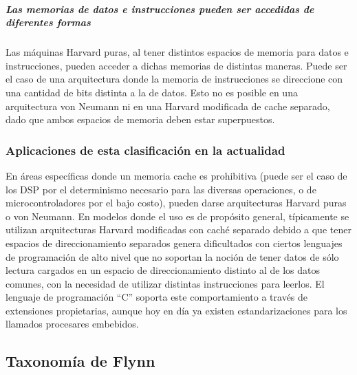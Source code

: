 \subparagraph{Las memorias de datos e instrucciones pueden ser accedidas de
diferentes formas}
\label{subpar:theory-modern-memory_access-modified_harvard-characteristitcs-3}

Las máquinas Harvard puras, al tener distintos espacios de memoria para datos e
instrucciones, pueden acceder a dichas memorias de distintas maneras. Puede ser
el caso de una arquitectura donde la memoria de instrucciones se direccione con
una cantidad de bits distinta a la de datos. Esto no es posible en una
arquitectura von Neumann ni en una Harvard modificada de cache separado, dado
que ambos espacios de memoria deben estar superpuestos.

\subsubsection{Aplicaciones de esta clasificación en la actualidad}
\label{subsubsec:theory-modern-memory_access-current_aplications}

En áreas específicas donde un memoria cache es prohibitiva (puede ser el caso de
los DSP por el determinismo necesario para las diversas operaciones, o de
microcontroladores por el bajo costo), pueden darse arquitecturas Harvard puras
o von Neumann. En modelos donde el uso es de propósito general, típicamente se
utilizan arquitecturas Harvard modificadas con caché separado debido a que tener
espacios de direccionamiento separados genera dificultados con ciertos lenguajes
de programación de alto nivel que no soportan la noción de tener datos de sólo
lectura cargados en un espacio de direccionamiento distinto al de los datos
comunes, con la necesidad de utilizar distintas instrucciones para leerlos. El
lenguaje de programación ``C'' soporta este comportamiento a través de
extensiones propietarias, aunque hoy en día ya existen estandarizaciones para
los llamados procesares embebidos.

\subsection{Taxonomía de Flynn}
\label{subsec:theory-modern-flynn_taxonomy}

